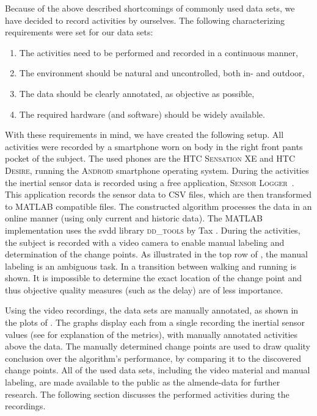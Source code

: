 Because of the above described shortcomings of commonly used data sets, we have decided to record activities by ourselves.
The following characterizing requirements were set for our data sets:
\begin{enumerate}
  \item The activities need to be performed and recorded in a continuous manner,
  \item The environment should be natural and uncontrolled, both in- and outdoor,
  \item The data should be clearly annotated, as objective as possible,
  \item The required hardware (and software) should be widely available.
\end{enumerate}

With these requirements in mind, we have created the following setup.
All activities were recorded by a smartphone worn on body in the right front pants pocket of the subject.
The used phones are the \textsc{HTC Sensation XE} and \textsc{HTC Desire}, running the \textsc{Android} smartphone operating system.
During the activities the inertial sensor data is recorded using a free application, \textsc{Sensor Logger}~\cite{sensorlogger}.
This application records the sensor data to \textsc{CSV} files, which are then transformed to \textsc{MATLAB} compatible files.
The constructed algorithm processes the data in an online manner (using only current and historic data).
The \textsc{MATLAB} implementation uses the \gls{svdd} library \textsc{dd\_tools} by Tax \cite{Ddtools2013}.
During the activities, the subject is recorded with a video camera to enable manual labeling and determination of the change points.
As illustrated in the top row of , the manual labeling is an ambiguous task.
In  a transition between walking and running is shown.
It is impossible to determine the exact location of the change point and thus objective quality measures (such as the delay) are of less importance.

Using the video recordings, the data sets are manually annotated, as shown in the plots of .
The graphs display each from a single recording the inertial sensor values (see  for explanation of the metrics), with manually annotated activities above the data.
The manually determined change points are used to draw quality conclusion over the algorithm's performance, by comparing it to the discovered change points.
All of the used data sets, including the video material and manual labeling, are made available to the public as the \acrlong{almende-data} \cite{vlasveld2014acras} for further research.
The following section discusses the performed activities during the recordings.
